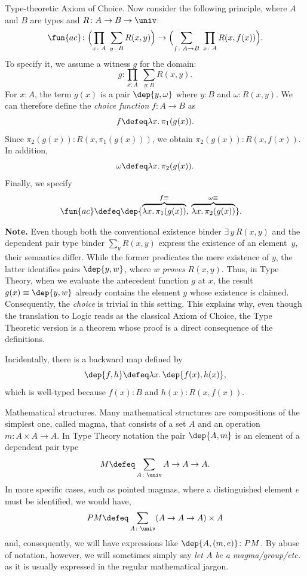 \begin{lpar}{Type-theoretic Axiom of Choice.}\label{lpar:axiom-of-choice}
    Now consider the following principle, where $A$ and $B$ are types and $R\colon A\to B\to\univ$:
    \[
        \fun{ac}\colon\Bigl(\prod_{x\colon A}\;\sum_{y\colon B}
            R(x,y)\Bigr)\to\Bigl(\sum_{f\colon A\to B}\;\prod_{x\colon A}R(x,f(x))\Bigr).
    \]
    To specify it, we assume a witness $g$ for the domain:
    \[
        g\colon \prod_{x\colon A}\;\sum_{y\colon B}R(x,y).
    \]
    For $x\colon A$, the term $g(x)$ is a pair $\dep{y,\omega}$ where $y\colon B$ and $\omega\colon R(x,y)$. We can therefore define the \textit{choice function\/} $f\colon A\to B$ as
    \[
        f\defeq\lambda x.\,\pi_1(g(x)).
    \]
    Since $\pi_2(g(x))\colon R(x,\pi_1(g(x)))$, we obtain $\pi_2(g(x))\colon R(x,f(x))$. In addition,
    \[
        \omega\defeq\lambda x.\,\pi_2(g(x)).
    \]
    Finally, we specify
    \begin{align*}
        \fun{ac}&\defeq
                \dep{
                \overbrace{\lambda x.\,\pi_1(g(x))}^{f\equiv},\,
                \overbrace{\lambda x.\,\pi_2(g(x))}^{\omega\equiv}
                }.
    \end{align*}
    
    \textbf{Note.} Even though both the conventional existence binder $\exists\,y\,R(x,y)$ and the dependent pair type binder $\sum_yR(x,y)$ express the existence of an element~$y$, their semantics differ. While the former predicates the mere existence of $y$, the latter identifies pairs $\dep{y,w}$, where $w$ \textit{proves\/} $R(x,y)$. Thus, in Type Theory, when we evaluate the antecedent function $g$ at $x$, the result $g(x)\equiv\dep{y,w}$ already contains the element $y$ whose existence is claimed. Consequently, the \textit{choice} is trivial in this setting. This explains why, even though the translation to Logic reads as the classical Axiom of Choice, the Type Theoretic version is a theorem whose proof is a direct consequence of the definitions.

    Incidentally, there is a backward map defined by
    \[
        \dep{f,h}\defeq\lambda x.\,\dep{f(x),h(x)},
    \]
    which is well-typed because $f(x)\colon B$ and $h(x)\colon R(x,f(x))$.
\end{lpar}

\begin{lpar}{Mathematical structures.}
    Many mathematical structures are compositions of the simplest one, called magma, that consists of a set $A$ and an operation $m\colon A\times A\to A$. In Type Theory notation the pair $\dep{A,m}$ is an element of a dependent pair type
    \[
        M \defeq\sum_{A\colon\univ}A\to A\to A.
    \]
    In more specific cases, such as pointed magmas, where a distinguished element $e$ must be identified, we would have,
    \[
        PM \defeq\sum_{A\colon\univ}(A\to A\to A)\times A
    \]
    and, consequently, we will have expressions like $\dep{A,(m,e)}\colon PM$. By abuse of notation, however, we will sometimes simply say \textit{let $A$ be a magma/group/etc.} as it is usually expressed in the regular mathematical jargon.
\end{lpar}

